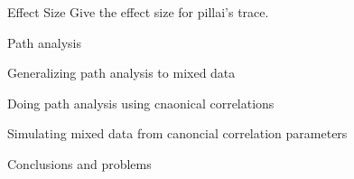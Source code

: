 \documentclass{beamer}
\begin{document}
\begin{frame}{Effect Size}
	Give the effect size for pillai's trace.
\end{frame}

\begin{frame}{Path analysis}
\end{frame}

\begin{frame}{Generalizing path analysis to mixed data}
\end{frame}

\begin{frame}{Doing path analysis using cnaonical correlations}
\end{frame}

\begin{frame}{Simulating mixed data from canoncial correlation parameters}
\end{frame}

\begin{frame}{Conclusions and problems}
\end{frame}
\end{document}
